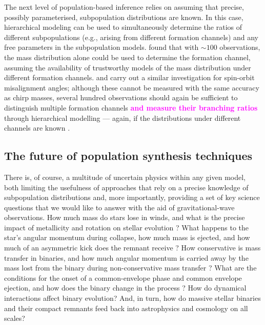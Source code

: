 \documentclass[review]{elsarticle}
\newcommand{\ilya}[1]{\textcolor{magenta}{\bf{#1}}}
\begin{document}
The next level of population-based inference relies on assuming that precise, possibly parameterised, subpopulation distributions are known.  In this case, hierarchical modeling \citep[extreme deconvolution in the language of][]{Hogg:2010} can be used to simultaneously determine the ratios of different subpopulations (e.g., arising from different formation channels) and any free parameters in the subpopulation models.  \citet{Zevin:2017} found that with $\sim 100$ observations, the mass distribution alone could be used to determine the formation channel, assuming the availability of trustworthy models of the mass distribution under different formation channels.  \citet{Vitale:2015} and \citet{Stevenson:2017spin} carry out a similar investigation for spin-orbit misalignment angles; although these cannot be measured with the same accuracy as chirp masses, several hundred observations should again be sufficient to distinguish multiple formation channels \ilya{and measure their branching ratios} through hierarchical modelling --- again, if the distributions under different channels are known \citep{Stevenson:2017spin}.  

\subsection{The future of population synthesis techniques}
There is, of course, a multitude of uncertain physics within any given model, both limiting the usefulness of approaches that rely on a precise knowledge of subpopulation distributions and, more importantly, providing a set of key science questions that we would like to answer with the aid of gravitational-wave observations.  How much mass do stars lose in winds, and what is the precise impact of metallicity and rotation on stellar evolution \citep[e.g.,][]{Renzo:2017}?  What happens to the star's angular momentum during collapse, how much mass is ejected, and how much of an asymmetric kick does the remnant receive \citep[e.g.,][]{Mirabel:2016}? How conservative is mass transfer in binaries, and how much angular momentum is carried away by the mass lost from the binary during non-conservative mass transfer \citep[e.g.,][]{vandenHeuvel:2017,Kruckow:2018}?  What are the conditions for the onset of a common-envelope phase and common envelope ejection, and how does the binary change in the process \citep[e.g.,][]{Ivanova:2013,Kruckow:2016}?   How do dynamical interactions affect binary evolution?  And, in turn, how do massive stellar binaries and their compact remnants feed back into astrophysics and cosmology on all scales?
\end{document}
